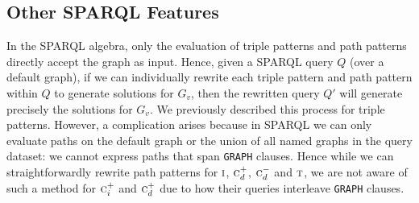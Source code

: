 \documentclass{llncs}
\makeatletter
\renewcommand\paragraph{\@startsection{paragraph}{4}{\z@}%
	{1ex \@plus1ex \@minus.2ex}%
	{-1em}%
	{\normalfont\normalsize\itshape}}
\newcommand{\ssyn}[3]{[\ensuremath{#1\,\textsc{#2}\,#3}]}
\newcommand{\suni}[2]{\ssyn{#1}{union}{#2}}
\newcommand{\sminus}[2]{\ssyn{#1}{minus}{#2}}
\newcommand{\sfrom}[3]{\ensuremath{\textsc{from}_{#2,#3}#1}}
\makeatother
\begin{document}
\subsection{Other SPARQL Features} 

In the SPARQL algebra, only the evaluation of triple patterns and path patterns directly accept the graph as input. Hence, given a SPARQL query $Q$ (over a default graph), if we can individually rewrite each triple pattern and path pattern within $Q$ to generate solutions for $G_v$, then the rewritten query $Q'$ will generate precisely the solutions for $G_v$. We previously described this process for triple patterns. However, a complication arises because in SPARQL we can only evaluate paths on the default graph or the union of all named graphs in the query dataset: we cannot express paths that span \texttt{GRAPH} clauses. Hence while we can straightforwardly rewrite path patterns for $\textsc{i}$, $\textsc{c}_d^{+}$, $\textsc{c}_d^{-}$ and $\textsc{t}$, we are not aware of such a method for $\textsc{c}_i^{+}$ and $\textsc{c}_d^{+}$ due to how their queries interleave \texttt{GRAPH} clauses.


%
\end{document}
